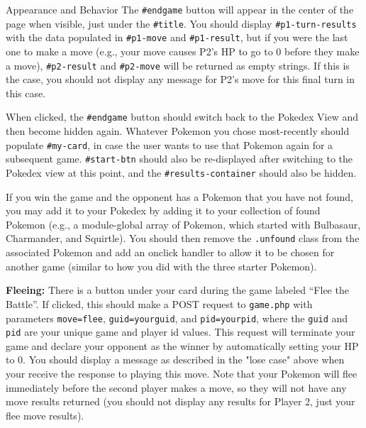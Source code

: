\documentclass[programming]{../../../../mfcs}
\begin{document}
\begin{question}{Appearance and Behavior}
The  \texttt{\#endgame}
button will appear in the center of the page when visible, just under the \texttt{\#title}. You
should display \texttt{\#p1-turn-results} with the data populated in \texttt{\#p1-move} and
\texttt{\#p1-result}, but if you were the last one to make a move (e.g., your move causes P2's HP to
go to 0 before they make a move),
\texttt{\#p2-result} and \texttt{\#p2-move} will be returned as empty strings. If this is the case,
you should not display any message for P2's move for this final turn in this case. 
\newline

When clicked, the \texttt{\#endgame} button should switch back to the Pokedex View and then become hidden again. 
Whatever Pokemon you chose most-recently should populate \texttt{\#my-card}, in case the user wants to use
that Pokemon again for a subsequent game. \texttt{\#start-btn} should also be re-displayed after
switching to the Pokedex view at this point, and the \texttt{\#results-container} should also be
hidden. 
\newline

If you win the game and the opponent has a Pokemon that you have
not found, you may add it to your Pokedex by adding it to your collection of found Pokemon (e.g., a
module-global array of Pokemon, which started with Bulbasaur, Charmander, and Squirtle). You should
then remove the \texttt{.unfound} class from the associated Pokemon and add an onclick handler to
allow it to be chosen for another game (similar to how you did with
the three starter Pokemon).
\newline

\textbf{Fleeing:}
There is a button under your card during the game labeled ``Flee the Battle''. If clicked, this
  should make a POST request to \texttt{game.php} with parameters \texttt{move=flee},
  \texttt{guid=yourguid}, and \texttt{pid=yourpid}, where the \texttt{guid} and \texttt{pid} are
  your unique game and player id values. This request will terminate your game
  and declare your opponent as the winner by automatically setting your HP to 0. You should display
  a message as described in the "lose case" above when your receive the response to playing this
  move. Note that your Pokemon will flee immediately before the second player makes a move, so they
  will not have any move results returned (you should not display any results for Player 2, just
  your flee move results).
\end{question}
\end{document}
